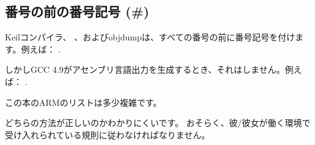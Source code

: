 ﻿

\subsection{番号の前の番号記号 (\#)}

Keilコンパイラ、 \IDA 、およびobjdumpは、すべての番号の前に\q{\#}番号記号を付けます。例えば：
.

しかしGCC 4.9がアセンブリ言語出力を生成するとき、それはしません。例えば：
.

この本のARMのリストは多少複雑です。

どちらの方法が正しいのかわかりにくいです。
おそらく、彼/彼女が働く環境で受け入れられている規則に従わなければなりません。




